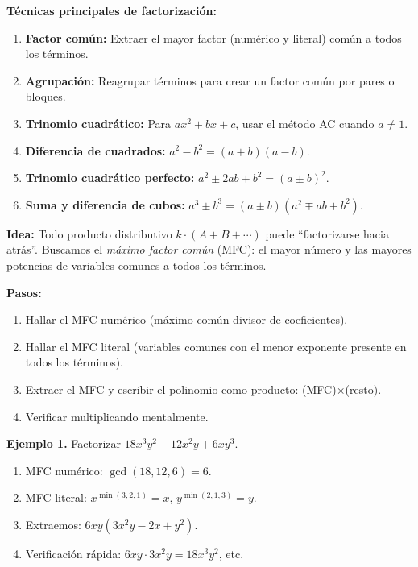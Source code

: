 \textbf{Técnicas principales de factorización:}

\begin{enumerate}
\item \textbf{Factor común:} Extraer el mayor factor (numérico y literal) común a todos los términos.
\item \textbf{Agrupación:} Reagrupar términos para crear un factor común por pares o bloques.
\item \textbf{Trinomio cuadrático:} Para $ax^2 + bx + c$, usar el método AC cuando $a \neq 1$.
\item \textbf{Diferencia de cuadrados:} $a^2 - b^2 = (a + b)(a - b)$.
\item \textbf{Trinomio cuadrático perfecto:} $a^2 \pm 2ab + b^2 = (a \pm b)^2$.
\item \textbf{Suma y diferencia de cubos:} $a^3 \pm b^3 = (a \pm b)(a^2 \mp ab + b^2)$.
\end{enumerate}


\textbf{Idea:} Todo producto distributivo $k\cdot(A + B + \cdots)$ puede “factorizarse hacia atrás”. Buscamos el \emph{máximo factor común} (MFC): el mayor número y las mayores potencias de variables comunes a todos los términos.

\textbf{Pasos:}
\begin{enumerate}
  \item Hallar el MFC numérico (máximo común divisor de coeficientes).
  \item Hallar el MFC literal (variables comunes con el menor exponente presente en todos los términos).
  \item Extraer el MFC y escribir el polinomio como producto: (MFC)$\times$(resto).
  \item Verificar multiplicando mentalmente.
\end{enumerate}

\begin{example}
\textbf{Ejemplo 1.} Factorizar $18x^3y^2 - 12x^2y + 6xy^3$.

\begin{enumerate}
  \item MFC numérico: $\gcd(18,12,6)=6$.
  \item MFC literal: $x^{\min(3,2,1)}=x$, $y^{\min(2,1,3)}=y$.
  \item Extraemos: $6xy(3x^2y - 2x + y^2)$.
  \item Verificación rápida: $6xy\cdot 3x^2y=18x^3y^2$, etc.
\end{enumerate}
\end{example}

